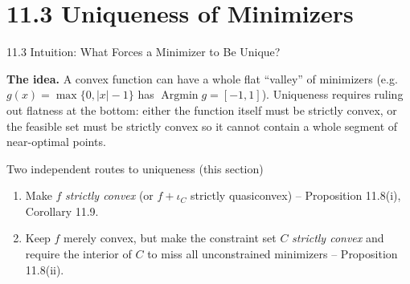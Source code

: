 \documentclass[aspectratio=169,10pt]{beamer}
\newcommand{\Argmin}{\operatorname{Argmin}}
\newcommand{\iC}{\iota_C}
\begin{document}
\section{11.3 Uniqueness of Minimizers}

\begin{frame}{11.3 Intuition: What Forces a Minimizer to Be Unique?}

  \textbf{The idea.} A convex function can have a whole flat
  ``valley'' of minimizers (e.g.\ $g(x)=\max\{0,|x|-1\}$ has
  $\Argmin g=[-1,1]$). Uniqueness requires ruling out flatness at the
  bottom: either the function itself must be strictly convex, or the
  feasible set must be strictly convex so it cannot contain a whole
  segment of near-optimal points.

  \begin{alertblock}{Two independent routes to uniqueness (this section)}
    \begin{enumerate}
      \item Make $f$ \emph{strictly convex} (or $f+\iC$ strictly
            quasiconvex) -- Proposition 11.8(i), Corollary 11.9.
      \item Keep $f$ merely convex, but make the constraint set $C$
            \emph{strictly convex} and require the interior of $C$ to
            miss all unconstrained minimizers -- Proposition 11.8(ii).
    \end{enumerate}
  \end{alertblock}

\end{frame}
\end{document}
